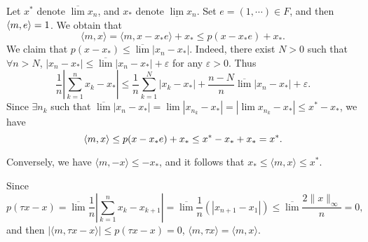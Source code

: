 \begin{enumerate}
\begin{answer}
\begin{enumerate}
        Let $x^*$ denote $\overline\lim x_n$, and $x_*$ denote $\underline \lim x_n$. Set $e = (1, \cdots)\in F$, and then $\langle m,e\rangle = 1$. We obtain that 
        \[ \langle m, x\rangle  = \langle m, x-x_*e\rangle + x_* \leq p(x-x_*e) + x_*.\]
        We claim that $p(x-x_*)\leq \overline\lim |x_n - x_*|$. Indeed, there exist $N>0$ such that $\forall n > N$, $|x_n - x_*| \leq \overline\lim |x_n - x_*| + \varepsilon$ for any $\varepsilon>0$. Thus 
        \[ \frac1n|\sum_{k=1}^n x_k - x_*|\leq \frac1n \sum_{k=1}^N |x_k - x_*| + \frac{n-N}{n}\overline\lim|x_n - x_*| + \varepsilon. \]
        Since $\exists n_k$ such that $\overline\lim |x_n - x_*|=\lim |x_{n_k} - x_*| = |\lim x_{n_k} - x_*| \leq x^*-x_*$,  we have 
        \[ \langle m,x\rangle\leq p(x - x_*e) + x_*\leq x^* - x_* + x_* = x^*. \]
        
        Conversely, we have $\langle m, -x\rangle \leq -x_*$, and it follows that $x_*\leq \langle m, x\rangle \leq x^*$.

        Since
        \[ p(\tau x - x) = \overline\lim \frac1n |\sum_{k = 1}^nx_k - x_{k+1}| = \overline\lim\frac1n(|x_{n+1}-x_1|)\leq \overline\lim \frac{2\|x\|_\infty}{n} = 0, \]
        and then $|\langle m, \tau x - x\rangle|\leq p(\tau x - x) = 0$, $\langle m, \tau x\rangle = \langle m, x\rangle$. 
    \end{enumerate}
    \end{answer}
\end{enumerate}


